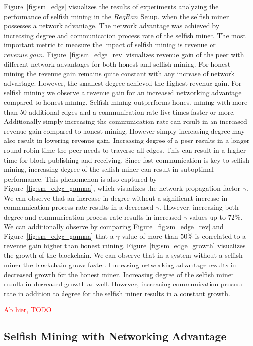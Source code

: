 \ifx
Figure~\ref{fig:sm_edge} visualizes the results of experiments analyzing the performance of selfish mining in the $RegRan$ Setup, when the selfish miner possesses a network advantage. The network advantage was achieved by increasing degree and communication process rate of the selfish miner.
The most important metric to measure the impact of selfish mining is revenue or $revenue~gain$. Figure~\ref{fig:sm_edge_rev} visualizes revenue gain of the peer with different network advantages for both honest and selfish mining. For honest mining the revenue gain remains quite constant with any increase of network advantage. However, the smallest degree achieved the highest revenue gain. For selfish mining we observe a revenue gain for an increased networking advantage compared to honest mining. Selfish mining outperforms honest mining with more than 50 additional edges and a communication rate five times faster or more. Additionally simply increasing the communication rate can result in an increased revenue gain compared to honest mining. However simply increasing degree may also result in lowering revenue gain. Increasing degree of a peer results in a longer round robin time the peer needs to traverse all edges. This can result in a higher time for block publishing and receiving. Since fast communication is key to selfish mining, increasing degree of the selfish miner can result in suboptimal performance.
This phenomenon is also captured by Figure~\ref{fig:sm_edge_gamma}, which visualizes the network propagation factor $\gamma$. We can observe that an increase in degree without a significant increase in communication process rate results in a decreased $\gamma$. However, increasing both degree and communication process rate results in increased $\gamma$ values up to $72\% $. We can additionally observe by comparing Figure~\ref{fig:sm_edge_rev} and Figure~\ref{fig:sm_edge_gamma} that a $\gamma$ value of more than $50\% $ is correlated to a revenue gain higher than honest mining.
Figure~\ref{fig:sm_edge_growth} visualizes the growth of the blockchain. We can observe that in a system without a selfish miner the blockchain grows faster. Increasing networking advantage results in decreased growth for the honest miner. Increasing degree of the selfish miner results in decreased growth as well. However, increasing communication process rate in addition to degree for the selfish miner results in a constant growth.
\fi



\ifx
\newpage
\textcolor{red}{Ab hier, TODO}
\subsection{Selfish Mining with Networking Advantage}

